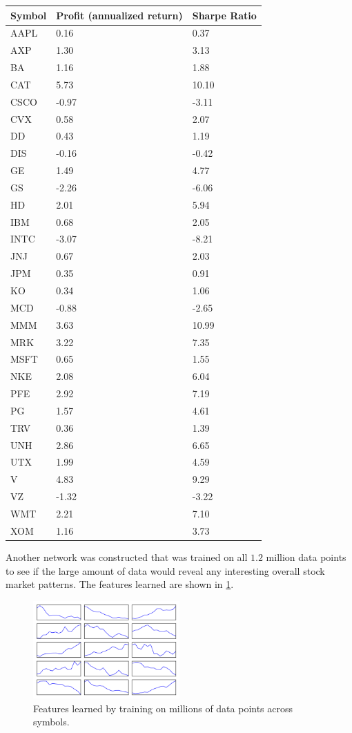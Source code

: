 \documentclass{article}
\begin{document}
\begin{tabular}{lll}
    Symbol & Profit (annualized return) & Sharpe Ratio \\ 
\toprule

    AAPL & 0.16 & 0.37 \\
    AXP & 1.30 & 3.13 \\
    BA & 1.16 & 1.88 \\
    CAT & 5.73 & 10.10 \\
    CSCO & -0.97 & -3.11 \\
    CVX & 0.58 & 2.07 \\
    DD & 0.43 & 1.19 \\
    DIS & -0.16 & -0.42 \\
    GE & 1.49 & 4.77 \\
    GS & -2.26 & -6.06 \\
    HD & 2.01 & 5.94 \\
    IBM & 0.68 & 2.05 \\
    INTC & -3.07 & -8.21 \\
    JNJ & 0.67 & 2.03 \\
    JPM & 0.35 & 0.91 \\
    KO & 0.34 & 1.06 \\
    MCD & -0.88 & -2.65 \\
    MMM & 3.63 & 10.99 \\
    MRK & 3.22 & 7.35 \\
    MSFT & 0.65 & 1.55 \\
    NKE & 2.08 & 6.04 \\
    PFE & 2.92 & 7.19 \\
    PG & 1.57 & 4.61 \\
    TRV & 0.36 & 1.39 \\
    UNH & 2.86 & 6.65 \\
    UTX & 1.99 & 4.59 \\
    V & 4.83 & 9.29 \\
    VZ & -1.32 & -3.22 \\
    WMT & 2.21 & 7.10 \\
    XOM & 1.16 & 3.73 \\
\end{tabular}

Another network was constructed that was trained on all $1.2$ million data points
to see if the large amount of data would reveal any interesting overall stock
market patterns. The features learned are shown in \ref{fig:big_feats}.

\begin{figure}[h]
    \includegraphics[width=0.5\textwidth]{mlp_feats_big}
    \caption{Features learned by training on millions of data points across symbols.}
    \label{fig:big_feats}
\end{figure}
\end{document}
